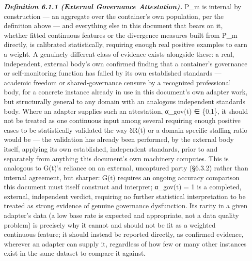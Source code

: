\documentclass[
]{article}
\begin{document}
\emph{\textbf{Definition 6.1.1 (External Governance Attestation).}} P\_m
is internal by construction --- an aggregate over the container's own
population, per the definition above --- and everything else in this
document that bears on it, whether fitted continuous features or the
divergence measures built from P\_m directly, is calibrated
statistically, requiring enough real positive examples to earn a weight.
A genuinely different class of evidence exists alongside these: a real,
independent, external body's own confirmed finding that a container's
governance or self-monitoring function has failed by its own established
standards --- academic freedom or shared-governance censure by a
recognized professional body, for a concrete instance already in use in
this document's own adapter work, but structurally general to any domain
with an analogous independent standards body. Where an adapter supplies
such an attestation, α\_gov(t) ∈ \{0,1\}, it should not be treated as
one continuous input among several requiring enough positive cases to be
statistically validated the way δR(t) or a domain-specific staffing
ratio would be --- the validation has already been performed, by the
external body itself, applying its own established, independent
standards, prior to and separately from anything this document's own
machinery computes. This is analogous to G(t)'s reliance on an external,
uncaptured party (§6.3.2) rather than internal agreement, but sharper:
G(t) requires an ongoing accuracy comparison this document must itself
construct and interpret; α\_gov(t) = 1 is a completed, external,
independent verdict, requiring no further statistical interpretation to
be treated as strong evidence of genuine governance dysfunction. Its
rarity in a given adapter's data (a low base rate is expected and
appropriate, not a data quality problem) is precisely why it cannot and
should not be fit as a weighted continuous feature; it should instead be
reported directly, as confirmed evidence, wherever an adapter can supply
it, regardless of how few or many other instances exist in the same
dataset to compare it against.
\end{document}
